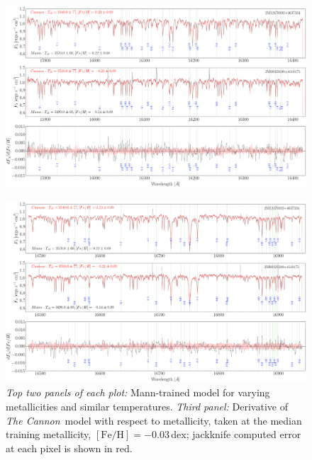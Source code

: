 \documentclass[twocolumn]{aastex62}
\newcommand{\thecannon}{\textsl{The Cannon}}
\newcommand{\cannon}{\textsl{Cannon}}
\newcommand{\feh}{[{\mathrm{Fe}/\mathrm{H}}]}
\begin{document}
\begin{figure}
	\begin{center}
	\includegraphics[width=16cm]{demo_derivatives_feh2.png}
	\end{center}
\end{figure}

\begin{figure}
	\begin{center}
	\includegraphics[width=16cm]{demo_derivatives_feh3.png}
	\end{center}
	\caption{\textit{Top two panels of each plot:} \color{red}{\bf APOGEE spectra (black), overlaid by the }\color{black} Mann-trained \color{red}{\bf \cannon\ }\color{black} model for \color{red}{\bf two sources of }\color{black} varying metallicities and similar temperatures. \textit{Third panel:} Derivative of \thecannon\ model with respect to metallicity, taken at the median training metallicity, $\feh=-0.03$\,dex; jackknife computed error at each pixel is shown in red.} \label{fig:demo_feh}
\end{figure}
\end{document}
